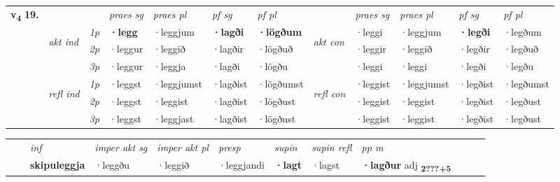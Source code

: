 \begin{tabular}{llllllllllll} \toprule
\multirow{4}{*}{{{\textbf{v{\textsubscript{4}}} \Large{\textbf{19.}}}}}  & &   &  \textit{praes sg}  & \textit{praes pl}  &\textit{ pf sg} & \textit{pf pl} &  &  \textit{praes sg}  & \textit{praes pl}  & \textit{pf sg} & \textit{pf pl } \\*
	\cmidrule{4-7} \cmidrule{9-12}
 & \multirow{3}{*}{\begin{turn}{90}\textit{akt ind}\end{turn}} & {\textit{1p}} & \textbf{·legg} & ·leggjum    & \textbf{·lagði} & \textbf{·lögðum} & \multirow{3}{*}{\begin{turn}{90}\textit{akt con}\end{turn}} &·leggi & ·leggjum & \textbf{·legði} & ·legðum\\*
& &  {\textit{2p}} &  ·leggur  & ·leggið   & ·lagðir & ·lögðuð & & ·leggir & ·leggið & ·legðir & ·legðuð \\*
& &  {\textit{3p}} & ·leggur & ·leggja   & ·lagði & ·lögðu & & ·leggi & ·leggi& ·legði & ·legðu  \\*
\cmidrule{4-7} \cmidrule{9-12}
 &\multirow{3}{*}{\begin{turn}{90}\textit{refl ind}\end{turn}} & {\textit{1p}} & ·leggst & ·leggjumst    & ·lagðist & ·lögðumst & \multirow{3}{*}{\begin{turn}{90}\textit{refl con}\end{turn}}  &·leggist & ·leggjumst & ·legðist & ·legðumst\\*
 &&  {\textit{2p}} &  ·leggst  & ·leggist   & ·lagðist & ·lögðust & &·leggist & ·leggist & ·legðist & ·legðust \\*
& &  {\textit{3p}} & ·leggst & ·leggjast   & ·lagðist & ·lögðust & & ·leggist & ·leggist& ·legðist & ·legðust  \\*
\cmidrule{4-7} \cmidrule{9-12}
\end{tabular}


\begin{tabular}{llllllllllll}
 & & \textit{inf} & \textit{imper akt sg} & \textit{imper akt pl}   & \textit{presp} & \textit{supin} & \textit{supin refl} & \textit{pp m}     \\*
  & & \textbf{skipuleggja} & ·leggðu  & ·leggið   & ·leggjandi &  \textbf{·lagt} & ·lagst & \textbf{·lagður} adj \textbf{\textsubscript{2???+5}} \\*
\cmidrule{1-12}
\end{tabular}



